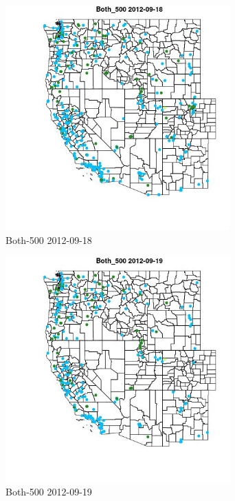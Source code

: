 \begin{figure} 
\centering  
\includegraphics[width=0.77\textwidth]{Code_Outputs/ML_input_report_ML_input_PM25_Step5_part_d_de_duplicated_aves_ML_input_MapObsBoth_5002012-09-18.jpg} 
\caption{\label{fig:ML_input_report_ML_input_PM25_Step5_part_d_de_duplicated_aves_ML_inputMapObsBoth_5002012-09-18}Both-500 2012-09-18} 
\end{figure} 
 

\begin{figure} 
\centering  
\includegraphics[width=0.77\textwidth]{Code_Outputs/ML_input_report_ML_input_PM25_Step5_part_d_de_duplicated_aves_ML_input_MapObsBoth_5002012-09-19.jpg} 
\caption{\label{fig:ML_input_report_ML_input_PM25_Step5_part_d_de_duplicated_aves_ML_inputMapObsBoth_5002012-09-19}Both-500 2012-09-19} 
\end{figure} 
 

